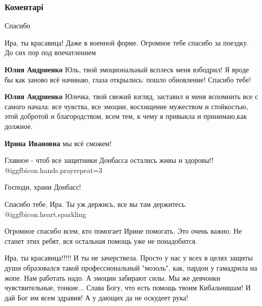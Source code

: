  
 
 
 
 
\subsubsection{Коментарі}

\begin{itemize} %
Спасибо

Ира, ты красавица! Даже в военной форме. Огромное тебе спасибо за поездку. До сих пор под впечатлением

\begin{itemize} %
\textbf{Юлия Андриенко} Юль, твой эмоциональный всплеск меня взбодрил! Я вроде бы как заново всё начинаю, глаза открылись: пошло обновление! Спасибо тебе!

\textbf{Юлия Андриенко} Юлечка, твой свежий взгляд, заставил и меня вспомнить все с самого начала: все чувства, все эмоции, восхищение мужеством и стойкостью, этой добротой и благородством, всем тем, к чему я привыкла и принимаю,как должное.

\textbf{Ирина Ивановна} мы всё сможем!
\end{itemize} %

Главное - чтоб все защитники Донбасса остались живы и здоровы!!  @igg{fbicon.hands.pray}{repeat=3} 

Господи, храни Донбасс!

Спасибо тебе, Ира. Ты уж держись, все вы там держитесь.  @igg{fbicon.heart.sparkling} 

Огромное спасибо всем, кто помогает Ирине помогать. Это очень важно. Не станет этих ребят, вся остальная помощь уже не понадобится.


Ира, ты красавица!!!!! И ты не зачерствела. Просто у нас у всех в целях защиты
души образовался такой профессиональный "мозоль", как, пардон у гамадрила на
жопе. Нам работать надо. А эмоции забирают силы. Мы же девчонки чувствительные,
тонкие... Слава Богу, что есть помощь твоим Кибальчишам! И дай Бог им всем
здравия! А у дающих да не оскудеет рука!


\end{itemize}
